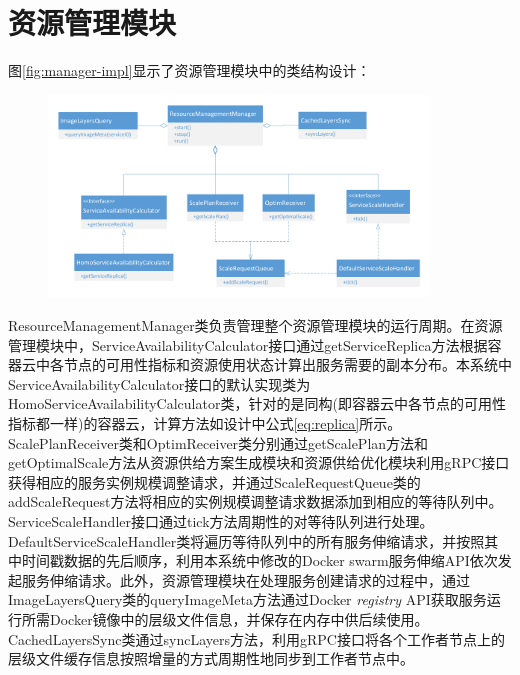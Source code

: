\section{资源管理模块}
图\ref{fig:manager-impl}显示了资源管理模块中的类结构设计：
\begin{figure}[H]
\centering
\includegraphics[width=0.9\textwidth]{./figure/manager_impl}
\end{figure}
ResourceManagementManager类负责管理整个资源管理模块的运行周期。在资源管理模块中，ServiceAvailabilityCalculator接口通过getServiceReplica方法根据容器云中各节点的可用性指标和资源使用状态计算出服务需要的副本分布。本系统中ServiceAvailabilityCalculator接口的默认实现类为HomoServiceAvailabilityCalculator类，针对的是同构(即容器云中各节点的可用性指标都一样)的容器云，计算方法如设计中公式\ref{eq:replica}所示。ScalePlanReceiver类和OptimReceiver类分别通过getScalePlan方法和getOptimalScale方法从资源供给方案生成模块和资源供给优化模块利用gRPC接口获得相应的服务实例规模调整请求，并通过ScaleRequestQueue类的addScaleRequest方法将相应的实例规模调整请求数据添加到相应的等待队列中。ServiceScaleHandler接口通过tick方法周期性的对等待队列进行处理。DefaultServiceScaleHandler类将遍历等待队列中的所有服务伸缩请求，并按照其中时间戳数据的先后顺序，利用本系统中修改的Docker swarm服务伸缩API依次发起服务伸缩请求。此外，资源管理模块在处理服务创建请求的过程中，通过ImageLayersQuery类的queryImageMeta方法通过Docker \emph{registry} API获取服务运行所需Docker镜像中的层级文件信息，并保存在内存中供后续使用。CachedLayersSync类通过syncLayers方法，利用gRPC接口将各个工作者节点上的层级文件缓存信息按照增量的方式周期性地同步到工作者节点中。

